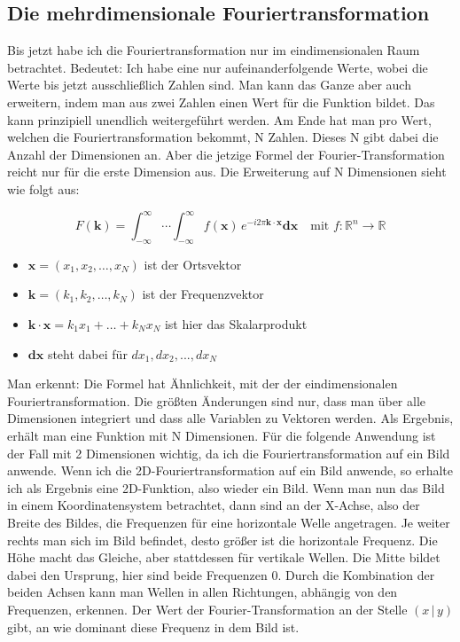 \documentclass[a4paper,12pt]{article}
\theoremstyle{definition}
\theoremstyle{remark}
\begin{document}
\subsection{Die mehrdimensionale Fouriertransformation}
Bis jetzt habe ich die Fouriertransformation nur im eindimensionalen Raum betrachtet. Bedeutet: Ich habe eine nur aufeinanderfolgende Werte, 
wobei die Werte bis jetzt ausschließlich Zahlen sind. Man kann das Ganze aber auch erweitern, indem man aus zwei Zahlen einen Wert für die 
Funktion bildet. Das kann prinzipiell unendlich weitergeführt werden. Am Ende hat man pro Wert, welchen die Fouriertransformation bekommt, N Zahlen.
Dieses N gibt dabei die Anzahl der Dimensionen an. Aber die jetzige Formel der Fourier-Transformation reicht nur für die erste Dimension aus. Die 
Erweiterung auf N Dimensionen sieht wie folgt aus: 

$$F(\mathbf{k}) = \int_{-\infty}^{\infty} \cdots \int_{-\infty}^{\infty} {f(\mathbf{x}) \, e^{-i2\pi \mathbf{k} \cdot \mathbf{x}} \mathbf{dx}} \quad \text{mit } f:\mathbb{R}^n \to \mathbb{R}$$
\begin{itemize}
  \item $\mathbf{x} = (x_1, x_2, \ldots, x_N)$ ist der Ortsvektor
  \item $\mathbf{k} = (k_1, k_2, \ldots, k_N)$ ist der Frequenzvektor
  \item $\mathbf{k} \cdot \mathbf{x} = k_1x_1 + \dots + k_Nx_N$ ist hier das Skalarprodukt
  \item $\mathbf{dx}$ steht dabei für $dx_1, dx_2, ..., dx_N$
\end{itemize}

Man erkennt: Die Formel hat Ähnlichkeit, mit der der eindimensionalen Fouriertransformation. Die größten Änderungen sind nur, dass man über alle 
Dimensionen integriert und dass alle Variablen zu Vektoren werden. Als Ergebnis, erhält man eine Funktion mit N Dimensionen. Für die folgende 
Anwendung ist der Fall mit 2 Dimensionen wichtig, da ich die Fouriertransformation auf ein Bild anwende. Wenn ich die 2D-Fouriertransformation 
auf ein Bild anwende, so erhalte ich als Ergebnis eine 2D-Funktion, also wieder ein Bild. Wenn man nun das Bild in einem Koordinatensystem betrachtet,
dann sind an der X-Achse, also der Breite des Bildes, die Frequenzen für eine horizontale Welle angetragen. Je weiter rechts man sich im Bild befindet,
desto größer ist die horizontale Frequenz. Die Höhe macht das Gleiche, aber stattdessen für vertikale Wellen. Die Mitte bildet dabei den Ursprung, hier sind beide 
Frequenzen 0. Durch die Kombination der beiden Achsen kann man Wellen in allen Richtungen, abhängig von den Frequenzen, erkennen. Der Wert der 
Fourier-Transformation an der Stelle $(x\,|\,y)$ gibt, an wie dominant diese Frequenz in dem Bild ist. 
\end{document}
